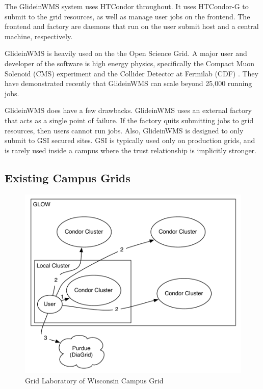 The GlideinWMS system uses HTCondor throughout.  It uses HTCondor-G \cite{frey2002condor} to submit to the grid resources, as well as manage user jobs on the frontend.  The frontend and factory are daemons that run on the user submit host and a central machine, respectively.  
 
GlideinWMS is heavily used on the the Open Science Grid.  A major user and developer of the software is high energy physics, specifically the Compact Muon Solenoid (CMS) experiment \cite{bradley2010use} and the Collider Detector at Fermilab (CDF) \cite{zvada2010cdf}.  They have demonstrated recently that GlideinWMS can scale beyond 25,000 running jobs.
 
GlideinWMS does have a few drawbacks.  GlideinWMS uses an external factory that acts as a single point of failure.  If the factory quits submitting jobs to grid resources, then users cannot run jobs.  Also, GlideinWMS is designed to only submit to GSI secured sites.  GSI is typically used only on production grids, and is rarely used inside a campus where the trust relationship is implicitly stronger.  



\subsection{Existing Campus Grids}



\begin{figure}[h!t]
	\centering
	\includegraphics[scale=0.6]{images/GLOW-Campus}
	\caption{Grid Laboratory of Wisconsin Campus Grid}
	\label{fig:GLOWCampus}
\end{figure}


